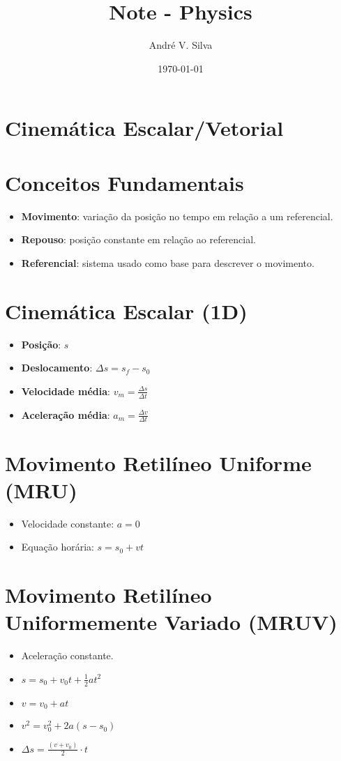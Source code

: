 \documentclass[a4paper,12pt]{article}
\title{ \textbf{\large Note - Physics}}
\author{Andr\'e V. Silva}
\date{\today}
\begin{document}
\begin{multicols}{2}

\justifying

\section{Cinemática Escalar/Vetorial}

\section{Conceitos Fundamentais}
\begin{itemize}
  \item \textbf{Movimento}: variação da posição no tempo em relação a um referencial.
  \item \textbf{Repouso}: posição constante em relação ao referencial.
  \item \textbf{Referencial}: sistema usado como base para descrever o movimento.
\end{itemize}

\section{Cinemática Escalar (1D)}
\begin{itemize}
  \item \textbf{Posição}: $s$
  \item \textbf{Deslocamento}: $\Delta s = s_f - s_0$
  \item \textbf{Velocidade média}: $v_m = \frac{\Delta s}{\Delta t}$
  \item \textbf{Aceleração média}: $a_m = \frac{\Delta v}{\Delta t}$
\end{itemize}

\section{Movimento Retilíneo Uniforme (MRU)}
\begin{itemize}
  \item Velocidade constante: $a = 0$
  \item Equação horária: $s = s_0 + v t$
\end{itemize}

\section{Movimento Retilíneo Uniformemente Variado (MRUV)}
\begin{itemize}
  \item Aceleração constante.
  \item $s = s_0 + v_0 t + \frac{1}{2} a t^2$
  \item $v = v_0 + a t$
  \item $v^2 = v_0^2 + 2a(s - s_0)$
  \item $\Delta s = \frac{(v + v_0)}{2} \cdot t$
\end{itemize}


\end{multicols}
\end{document}
